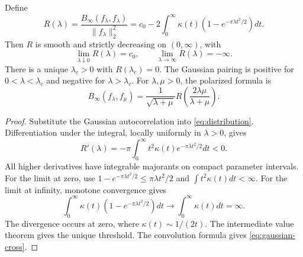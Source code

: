 \documentclass[11pt]{article}
\begin{document}
\begin{theorem}\label{thm:gaussian}
Define
\begin{equation}\label{eq:gaussian}
 R(\lambda)=\frac{B_\infty(f_\lambda,f_\lambda)}{\|f_\lambda\|_2^2}
   =c_0-2\int_0^\infty\kappa(t)(1-e^{-\pi\lambda t^2/2})dt.
\end{equation}
Then $R$ is smooth and strictly decreasing on $(0,\infty)$, with
\[
 \lim_{\lambda\downarrow0}R(\lambda)=c_0,\qquad
 \lim_{\lambda\to\infty}R(\lambda)=-\infty.
\]
There is a unique $\lambda_c>0$ with $R(\lambda_c)=0$.
The Gaussian pairing is positive for $0<\lambda<\lambda_c$ and negative for $\lambda>\lambda_c$.
For $\lambda,\mu>0$, the polarized formula is
\begin{equation}\label{eq:gaussian-cross}
 B_\infty(f_\lambda,f_\mu)
   =\frac1{\sqrt{\lambda+\mu}}
          R\left(\frac{2\lambda\mu}{\lambda+\mu}\right).
\end{equation}
\end{theorem}
\begin{proof}
Substitute the Gaussian autocorrelation into \eqref{eq:distribution}.
Differentiation under the integral, locally uniformly in $\lambda>0$, gives
\[
 R'(\lambda)=-\pi\int_0^\infty t^2\kappa(t)e^{-\pi\lambda t^2/2}dt<0.
\]
All higher derivatives have integrable majorants on compact parameter intervals.
For the limit at zero, use
$1-e^{-\pi\lambda t^2/2}\le\pi\lambda t^2/2$ and $\int t^2\kappa(t)dt<\infty$.
For the limit at infinity, monotone convergence gives
\[
 \int_0^\infty\kappa(t)(1-e^{-\pi\lambda t^2/2})dt
       \longrightarrow\int_0^\infty\kappa(t)dt=\infty.
\]
The divergence occurs at zero, where $\kappa(t)\sim1/(2t)$.
The intermediate value theorem gives the unique threshold.
The convolution formula gives \eqref{eq:gaussian-cross}.
\end{proof}
\end{document}
